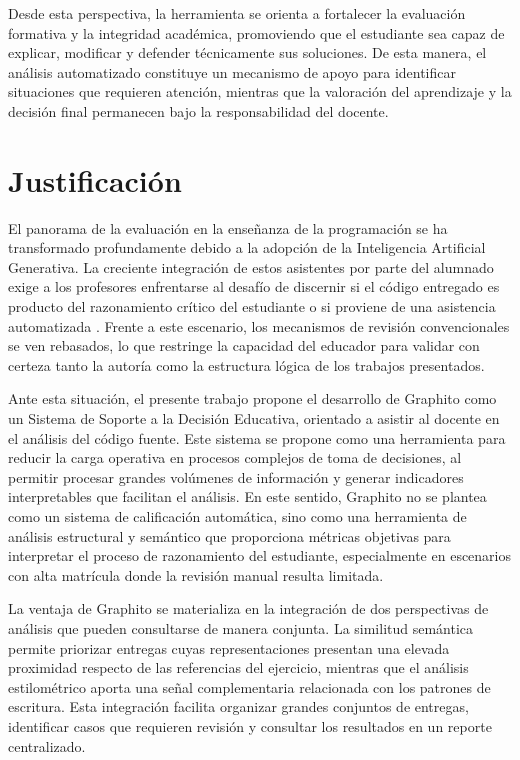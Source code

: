 Desde esta perspectiva, la herramienta se orienta a fortalecer la evaluación formativa y la integridad académica, promoviendo que el estudiante sea capaz de explicar, modificar y defender técnicamente sus soluciones. De esta manera, el análisis automatizado constituye un mecanismo de apoyo para identificar situaciones que requieren atención, mientras que la valoración del aprendizaje y la decisión final permanecen bajo la responsabilidad del docente.

\section{Justificación}

El panorama de la evaluación en la enseñanza de la programación se ha transformado profundamente debido a la adopción de la Inteligencia Artificial Generativa. La creciente integración de estos asistentes por parte del alumnado exige a los profesores enfrentarse al desafío de discernir si el código entregado es producto del razonamiento crítico del estudiante o si proviene de una asistencia automatizada \cite{Jose2025Cognitive,Shen2026Skill,Mekterovic2023Scaling,messer2024limitations}. Frente a este escenario, los mecanismos de revisión convencionales se ven rebasados, lo que restringe la capacidad del educador para validar con certeza tanto la autoría como la estructura lógica de los trabajos presentados.

Ante esta situación, el presente trabajo propone el desarrollo de Graphito como un Sistema de Soporte a la Decisión Educativa, orientado a asistir al docente en el análisis del código fuente. Este sistema se propone como una herramienta para reducir la carga operativa en procesos complejos de toma de decisiones, al permitir procesar grandes volúmenes de información y generar indicadores interpretables que facilitan el análisis. En este sentido, Graphito no se plantea como un sistema de calificación automática, sino como una herramienta de análisis estructural y semántico que proporciona métricas objetivas para interpretar el proceso de razonamiento del estudiante, especialmente en escenarios con alta matrícula donde la revisión manual resulta limitada.

La ventaja de Graphito se materializa en la integración de dos perspectivas de análisis que pueden consultarse de manera conjunta. La similitud semántica permite priorizar entregas cuyas representaciones presentan una elevada proximidad respecto de las referencias del ejercicio, mientras que el análisis estilométrico aporta una señal complementaria relacionada con los patrones de escritura. Esta integración facilita organizar grandes conjuntos de entregas, identificar casos que requieren revisión y consultar los resultados en un reporte centralizado.

